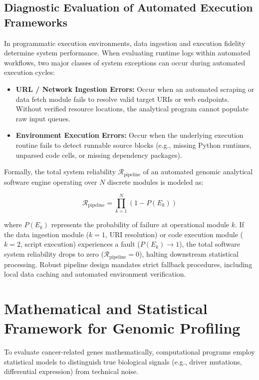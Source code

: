 \documentclass{article}
\begin{document}
\subsection{Diagnostic Evaluation of Automated Execution Frameworks}

In programmatic execution environments, data ingestion and execution fidelity determine system performance. When evaluating runtime logs within automated workflows, two major classes of system exceptions can occur during automated execution cycles:

\begin{itemize}
    \item \textbf{URL / Network Ingestion Errors:} Occur when an automated scraping or data fetch module fails to resolve valid target URIs or web endpoints. Without verified resource locations, the analytical program cannot populate raw input queues.
    \item \textbf{Environment Execution Errors:} Occur when the underlying execution routine fails to detect runnable source blocks (e.g., missing Python runtimes, unparsed code cells, or missing dependency packages).
\end{itemize}

Formally, the total system reliability $\mathcal{R}_{\text{pipeline}}$ of an automated genomic analytical software engine operating over $N$ discrete modules is modeled as:

\begin{equation}
\mathcal{R}_{\text{pipeline}} = \prod_{k=1}^{N} \left( 1 - P(E_k) \right)
\end{equation}

where $P(E_k)$ represents the probability of failure at operational module $k$. If the data ingestion module ($k=1$, URI resolution) or code execution module ($k=2$, script execution) experiences a fault ($P(E_k) \to 1$), the total software system reliability drops to zero ($\mathcal{R}_{\text{pipeline}} = 0$), halting downstream statistical processing. Robust pipeline design mandates strict fallback procedures, including local data caching and automated environment verification.

\section{Mathematical and Statistical Framework for Genomic Profiling}

To evaluate cancer-related genes mathematically, computational programs employ statistical models to distinguish true biological signals (e.g., driver mutations, differential expression) from technical noise.
\end{document}
